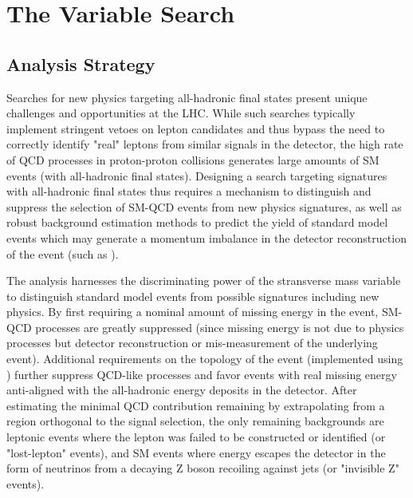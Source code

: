 \chapter{The \mttwo Variable Search}
\label{ch:analysis}

\section{Analysis Strategy}
Searches for new physics targeting all-hadronic final states present unique challenges and opportunities at the LHC. While such searches typically implement stringent vetoes on lepton candidates and thus bypass the need to correctly identify "real" leptons from similar signals in the detector, the high rate of QCD processes in proton-proton collisions generates large amounts of SM events (with all-hadronic final states). Designing a search targeting signatures with all-hadronic final states thus requires a mechanism to distinguish and suppress the selection of SM-QCD events from new physics signatures, as well as robust background estimation methods to predict the yield of standard model events which may generate a momentum imbalance in the detector reconstruction of the event (such as \znunu).

The \mttwo analysis harnesses the discriminating power of the \mttwo stransverse mass variable to distinguish standard model events from possible signatures including new physics. By first requiring a nominal amount of missing energy in the event, SM-QCD processes are greatly suppressed (since missing energy is not due to physics processes but detector reconstruction or mis-measurement of the underlying event). Additional requirements on the topology of the event (implemented using \mttwo) further suppress QCD-like processes and favor events with real missing energy anti-aligned with the all-hadronic energy deposits in the detector. After estimating the minimal QCD contribution remaining by extrapolating from a region orthogonal to the signal selection, the only remaining backgrounds are leptonic events where the lepton was failed to be constructed or identified (or "lost-lepton" events), and SM events where energy escapes the detector in the form of neutrinos from a decaying Z boson recoiling against jets (or "invisible Z" events).

